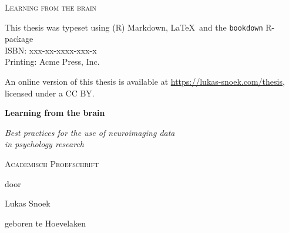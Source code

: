 \documentclass[12pt,american,a4paper,oneside,]{memoir} %
\begin{document}
\frontmatter
\thispagestyle{empty}
\def\drop{.1\textheight}

\vspace*{\drop}
\begin{center}
\Huge \textsc{Learning from the brain}
\end{center}

\clearpage
\thispagestyle{empty}
\vspace*{\fill}
\begingroup %
\small
\setlength{\parskip}{\baselineskip} %
\setlength\parindent{0pt} %

This thesis was typeset using (R) Markdown, \LaTeX\ and the \verb+bookdown+ R-package
\\ ISBN: xxx-xx-xxxx-xxx-x\\ Printing: Acme Press, Inc.

An online version of this thesis is available at \url{https://lukas-snoek.com/thesis}, licensed under a CC BY.
\endgroup

\clearpage
\thispagestyle{empty}
\vspace*{\drop}
\begin{center}
\Huge\textbf{Learning from the brain}\par
\vspace{\baselineskip}
\Large\textit{Best practices for the use of neuroimaging data\\
in psychology research}\par
\vfill %
\large \textsc{Academisch Proefschrift}\par
\vspace{\baselineskip}
\par %
\vspace{\baselineskip}
{\large door}\par
\vspace{\baselineskip}
{\Large Lukas Snoek}\par
\vspace{\baselineskip}
{\large geboren te Hoevelaken}
\end{center}
\end{document}
